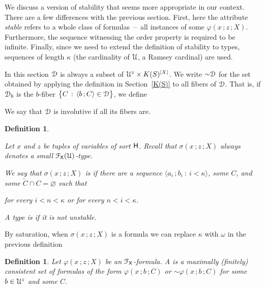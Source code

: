 \documentclass{amsproc}
\newcounter{thm}
\theoremstyle{mio}
\newtheorem{definition}[thm]{Definition}\tcolorboxenvironment{definition}{mythm}
\renewcommand*{\emph}[1]{%
   \smash{\tikz[baseline]\node[rectangle, fill=teal!25, rounded corners, inner xsep=0.5ex, inner ysep=0.2ex, anchor=base, minimum height = 2.7ex]{\strut #1};}}
\begin{document}
We discuss a version of stability that seems more appropriate in our context.
There are a few differences with the previous section.
First, here the attribute \textit{stable\/} refers to a whole class of formulas~--~all instances of some $\varphi(x\,;z\,;X)$.
Furthermore, the sequence witnessing the order property is required to be infinite.
Finally, since we need to extend the definition of stability to types, sequences of length $\kappa$ (the cardinality of ${\EuScript U}$, a Ramsey cardinal) are used.

In this section  ${\EuScript D}$ is always a subset of ${\EuScript U}^z\times K(S)^{|X|}$.
We write ${\sim}{\EuScript D}$ for the set obtained by applying the definition in Section~\ref{K(S)} to all fibers of ${\EuScript D}$.
That is, if ${\EuScript D}_b$ is the $b$-fiber $\big\{C\,:\,\langle b\,;C\rangle\in{\EuScript D}\big\}$, we define


We say that ${\EuScript D}$ is involutive if all its fibers are.

\begin{definition}\label{def_stable}\strut
  Let $x$ and $z$ be tuples of variables of sort ${\sf H}$.
  Recall that $\sigma(x\,;z\,;X)$ always denotes a small ${\EuScript F}_{\sf X}({\EuScript U})$-type.\smallskip

  We say that $\sigma(x\,;z\,;X)$ is \emph{unstable\/} if there are a sequence $\langle a_i\,;b_i\ :\ i<\kappa\rangle$, some $C$, and some $\tilde C\cap C=\varnothing$ such that\smallskip

  \hfill for every $i<n<\kappa$ or for every $n<i<\kappa$.\smallskip

      
  A type is \emph{stable\/} if it is not unstable.
\end{definition}

By saturation, when $\sigma(x\,;z\,;X)$ is a formula we can replace $\kappa$ with $\omega$ in the previous definition

\begin{definition}\strut 
  Let $\varphi(x\,;z\,;X)$ be an ${\EuScript F}_{\sf X}$-formula.
  A \emph{global $\varphi(x\,;z\,;X)$-type\/} is a maximally (finitely) consistent set of formulas of the form $\varphi(x\,;b\,;C)$ or ${\sim}\varphi(x\,;b\,;C)$ for some $b\in{\EuScript U}^{z}$ and some $C$.
\end{definition}
\end{document}
